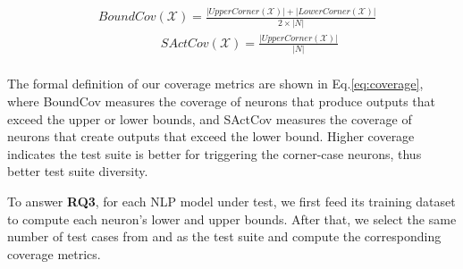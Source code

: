 \begin{equation}
\begin{split}
     & BoundCov(\mathcal{X}) = \frac{|UpperCorner(\mathcal{X})| + |LowerCorner(\mathcal{X})| }{2 \times |N|} \\ 
     &\quad  \qquad \qquad  SActCov(\mathcal{X}) = \frac{|UpperCorner(\mathcal{X})|} {|N|} \\ 
\end{split}
    \label{eq:coverage}
\end{equation}

\noindent The formal definition of our coverage metrics are shown in
Eq.\ref{eq:coverage}, where BoundCov measures the coverage of neurons
that produce outputs that exceed the upper or lower bounds, and
SActCov measures the coverage of neurons that create outputs that
exceed the lower bound.  Higher coverage indicates the test suite is
better for triggering the corner-case neurons, thus better test suite
diversity.





To answer {\bf RQ3}, for each NLP model under test, we first feed its
training dataset to compute each neuron's lower and upper
bounds. After that, we select the same number of test cases from \tool
and \Cklst as the test suite and compute the corresponding coverage
metrics.


